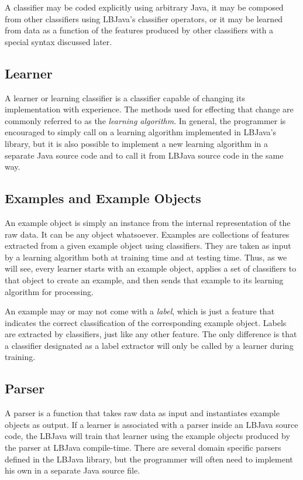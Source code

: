 A classifier may be coded explicitly using arbitrary Java, it may be composed
from other classifiers using LBJava's classifier operators, or it may be learned
from data as a function of the features produced by other classifiers with a
special syntax discussed later.

\subsection*{Learner}
A learner or learning classifier is a classifier capable of changing its
implementation with experience.  The methods used for effecting that change
are commonly referred to as the \emph{learning algorithm}.  In general, the
programmer is encouraged to simply call on a learning algorithm implemented in
LBJava's library, but it is also possible to implement a new learning algorithm
in a separate Java source code and to call it from LBJava source code in the same
way.

\subsection*{Examples and Example Objects}
An example object is simply an instance from the internal representation of
the raw data.  It can be any object whatsoever.  Examples are collections of
features extracted from a given example object using classifiers.  They are
taken as input by a learning algorithm both at training time and at testing
time.  Thus, as we will see, every learner starts with an example object,
applies a set of classifiers to that object to create an example, and then
sends that example to its learning algorithm for processing.

An example may or may not come with a \emph{label}, which is just a feature
that indicates the correct classification of the corresponding example object.
Labels are extracted by classifiers, just like any other feature.  The only
difference is that a classifier designated as a label extractor will only be
called by a learner during training.

\subsection*{Parser}
A parser is a function that takes raw data as input and instantiates example
objects as output.  If a learner is associated with a parser inside an LBJava
source code, the LBJava will train that learner using the example objects
produced by the parser at LBJava compile-time.  There are several domain specific
parsers defined in the LBJava library, but the programmer will often need to
implement his own in a separate Java source file.

